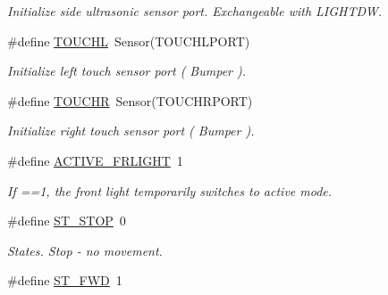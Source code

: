 \begin{DoxyCompactItemize}
\begin{DoxyCompactList}\small\item\em Initialize side ultrasonic sensor port. Exchangeable with LIGHTDW. \item\end{DoxyCompactList}\item 
\hypertarget{reactor_8nxc_a98c4f75c182ff1c7c6f3fb288f4f3857}{
\#define \hyperlink{reactor_8nxc_a98c4f75c182ff1c7c6f3fb288f4f3857}{TOUCHL}~Sensor(TOUCHLPORT)}
\label{reactor_8nxc_a98c4f75c182ff1c7c6f3fb288f4f3857}

\begin{DoxyCompactList}\small\item\em Initialize left touch sensor port ( Bumper ). \item\end{DoxyCompactList}\item 
\hypertarget{reactor_8nxc_a6537370af17fd38a56bcf670d8db23e3}{
\#define \hyperlink{reactor_8nxc_a6537370af17fd38a56bcf670d8db23e3}{TOUCHR}~Sensor(TOUCHRPORT)}
\label{reactor_8nxc_a6537370af17fd38a56bcf670d8db23e3}

\begin{DoxyCompactList}\small\item\em Initialize right touch sensor port ( Bumper ). \item\end{DoxyCompactList}\item 
\hypertarget{reactor_8nxc_a4b9906c8adddf636daee1677e3172b90}{
\#define \hyperlink{reactor_8nxc_a4b9906c8adddf636daee1677e3172b90}{ACTIVE\_\-FRLIGHT}~1}
\label{reactor_8nxc_a4b9906c8adddf636daee1677e3172b90}

\begin{DoxyCompactList}\small\item\em If ==1, the front light temporarily switches to active mode. \item\end{DoxyCompactList}\item 
\hypertarget{reactor_8nxc_a8ccbe4f289c6182e18589c6f2c6108ee}{
\#define \hyperlink{reactor_8nxc_a8ccbe4f289c6182e18589c6f2c6108ee}{ST\_\-STOP}~0}
\label{reactor_8nxc_a8ccbe4f289c6182e18589c6f2c6108ee}

\begin{DoxyCompactList}\small\item\em States. Stop -\/ no movement. \item\end{DoxyCompactList}\item 
\hypertarget{reactor_8nxc_abba849981e74e84eb3836d3c03c363a9}{
\#define \hyperlink{reactor_8nxc_abba849981e74e84eb3836d3c03c363a9}{ST\_\-FWD}~1}
\label{reactor_8nxc_abba849981e74e84eb3836d3c03c363a9}


\end{DoxyCompactItemize}
